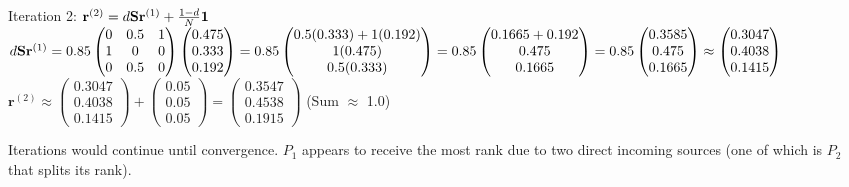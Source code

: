 {Iteration 2: $\mathbf{r}^{(2)} = d\mathbf{S}\mathbf{r}^{(1)} + \frac{1-d}{N}\mathbf{1}$
$d\mathbf{S}\mathbf{r}^{(1)} = 0.85 \begin{pmatrix} 0 & 0.5 & 1 \\ 1 & 0 & 0 \\ 0 & 0.5 & 0 \end{pmatrix} \begin{pmatrix} 0.475 \\ 0.333 \\ 0.192 \end{pmatrix} = 0.85 \begin{pmatrix} 0.5(0.333) + 1(0.192) \\ 1(0.475) \\ 0.5(0.333) \end{pmatrix} = 0.85 \begin{pmatrix} 0.1665 + 0.192 \\ 0.475 \\ 0.1665 \end{pmatrix} = 0.85 \begin{pmatrix} 0.3585 \\ 0.475 \\ 0.1665 \end{pmatrix} \approx \begin{pmatrix} 0.3047 \\ 0.4038 \\ 0.1415 \end{pmatrix}$
$\mathbf{r}^{(2)} \approx \begin{pmatrix} 0.3047 \\ 0.4038 \\ 0.1415 \end{pmatrix} + \begin{pmatrix} 0.05 \\ 0.05 \\ 0.05 \end{pmatrix} = \begin{pmatrix} 0.3547 \\ 0.4538 \\ 0.1915 \end{pmatrix}$ (Sum $\approx$ 1.0)

Iterations would continue until convergence. $P_1$ appears to receive the most rank due to two direct incoming sources (one of which is $P_2$ that splits its rank).
}

